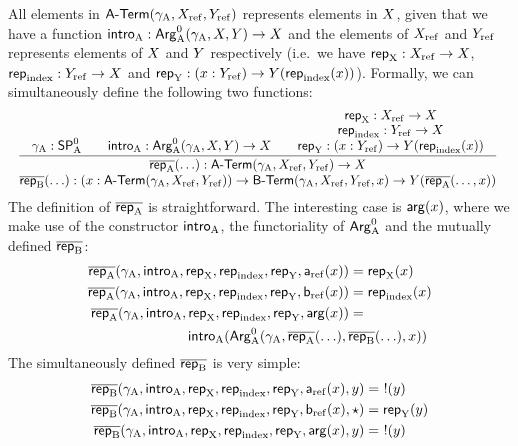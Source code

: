 \documentclass{article}
\begin{document}
All elements in $\Aterm(\gammaA,\Xref, \Yref)$ represents elements in
$\A$, given that we have a function $\introA : \ArgAp(\gammaA, \A, \B) \to
\A$ and the elements of $\Xref$ and $\Yref$ represents elements of $\A$
and $\B$ respectively (i.e.\ we have $\repA : \Xref \to \A$, $\repIndex
: \Yref \to \A$ and $\repB : (x : \Yref) \to \B(\repIndex(x))$).
Formally, we can simultaneously define the following two functions:
%
\[ %
\resizebox{\textwidth}{!}{%
$
\infer{\deduce{\repBbar(\ldots) : (x : \Aterm(\gammaA, \Xref, \Yref)) \to \Bterm(\gammaA, \Xref, \Yref, x) \to \B(\repAbar(\ldots, x))}
              {\repAbar(\ldots) : \Aterm(\gammaA, \Xref, \Yref) \to \A}}
      {\gammaA : \SPAp & \quad
       \introA : \ArgAp(\gammaA, \A, \B) \to \A & \quad
       \deduce{\repB : (x : \Yref) \to \B(\repIndex(x))}
              {\deduce{\repIndex : \Yref \to \A}
                      {\repA : \Xref \to \A}}}
$
}
\]
%
The definition of $\repAbar$ is straightforward. The interesting case
is $\termArg(x)$, where we make use of the constructor $\introA$, the
functoriality of $\ArgAp$ and the mutually defined $\repBbar$:
\begin{align*}
  \repAbar(\gammaA, \introA, \repA, \repIndex, \repB, \termAref(x)) &= \repA(x) \\
  \repAbar(\gammaA, \introA, \repA, \repIndex, \repB, \termBref(x)) &= \repIndex(x) \\
  \repAbar(\gammaA, \introA, \repA, \repIndex, \repB, \termArg(x)) &= \\
\multispan{2}{\hfill $\introA(\ArgAp(\gammaA, \repAbar(\ldots), \repBbar(\ldots), x))$}
\end{align*}
%
The simultaneously defined $\repBbar$ is very simple:
%
\begin{align*}
  \repBbar(\gammaA, \introA, \repA, \repIndex, \repB, \termAref(x), y) &=\ \magicOmit{\B \circ \repAbar(\ldots)}(y) \\
\repBbar(\gammaA, \introA, \repA, \repIndex, \repB, \termBref(x), \oneelt) &= \repB(y) \\
\repBbar(\gammaA, \introA, \repA, \repIndex, \repB, \termArg(x), y) &=\ \magicOmit{\B \circ \repAbar(\ldots)}(y) \\ \\
\end{align*}
\end{document}
